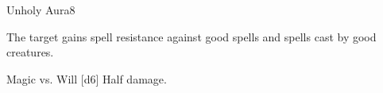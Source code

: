 
\begin{spellsection}{Unholy Aura}{8}
    \begin{spellheader}
    \end{spellheader}
    \begin{spellcontent}
        \begin{spelltargetinginfo}
        \end{spelltargetinginfo}
        \begin{spelleffects}
            \spelleffect The target gains spell resistance against good spells and spells cast by good creatures.
            \spelldur \durshort \dismissable
        \end{spelleffects}
    \end{spellcontent}
    \begin{spellsubcontent}
        \begin{spelltargetinginfo}
        \end{spelltargetinginfo}
        \begin{spelleffects}
            \begin{spellattack}{Magic vs. Will}
                \spellsuccess {}[d6]
                \spellfailure Half damage.
            \end{spellattack}
        \end{spelleffects}
    \end{spellsubcontent}
    \begin{spellfooter}
        \miscastexplode
    \end{spellfooter}
\end{spellsection}

